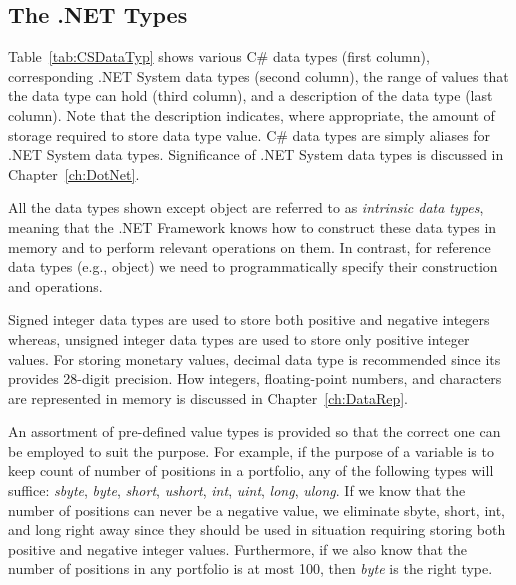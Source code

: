 \clearpage

\subsection{The .NET Types} \label{sec:DNTypes}


Table~\ref{tab:CSDataTyp} shows various C\# data types (first
column), corresponding .NET System data types (second column), the
range of values that the data type can hold (third column), and a
description of the data type (last column). Note that the
description indicates, where appropriate, the amount of storage
required to store data type value. C\# data types are simply
aliases for .NET System data types. Significance of .NET System
data types is discussed in Chapter~\ref{ch:DotNet}.


All the data types shown except object are referred to as
\emph{intrinsic data types}, meaning that the .NET Framework knows
how to construct these data types in memory and to perform
relevant operations on them. In contrast, for reference data types
(e.g., object) we need to programmatically specify their
construction and operations.

Signed integer data types are used to store both positive and
negative integers whereas, unsigned integer data types are used to
store only positive integer values. For storing monetary values,
decimal data type is recommended since its provides 28-digit
precision. How integers, floating-point numbers, and characters
are represented in memory is discussed in
Chapter~\ref{ch:DataRep}.

An assortment of pre-defined value types is provided so that the
correct one can be employed to suit the purpose. For example, if
the purpose of a variable is to keep count of number of positions
in a portfolio, any of the following types will suffice:
\emph{sbyte}, \emph{byte}, \emph{short}, \emph{ushort},
\emph{int}, \emph{uint}, \emph{long}, \emph{ulong}. If we know
that the number of positions can never be a negative value, we
eliminate sbyte, short, int, and long right away since they should
be used in situation requiring storing both positive and negative
integer values. Furthermore, if we also know that the number of
positions in any portfolio is at most 100, then \emph{byte} is the
right type.



